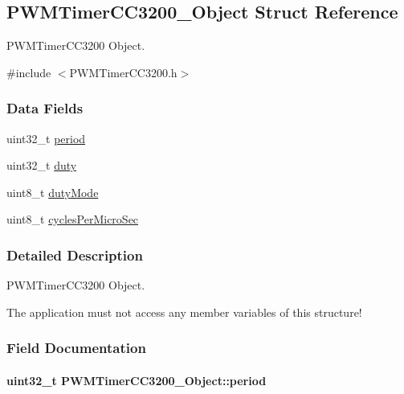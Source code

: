 \subsection{P\-W\-M\-Timer\-C\-C3200\-\_\-\-Object Struct Reference}
\label{struct_p_w_m_timer_c_c3200___object}


P\-W\-M\-Timer\-C\-C3200 Object.  




{\ttfamily \#include $<$P\-W\-M\-Timer\-C\-C3200.\-h$>$}

\subsubsection*{Data Fields}
\begin{DoxyCompactItemize}
\item 
uint32\-\_\-t \hyperlink{struct_p_w_m_timer_c_c3200___object_aef605d284151cde91a5ea31f247c0aed}{period}
\item 
uint32\-\_\-t \hyperlink{struct_p_w_m_timer_c_c3200___object_abcda935ccb7d1926e3044fe22c742ed7}{duty}
\item 
uint8\-\_\-t \hyperlink{struct_p_w_m_timer_c_c3200___object_af1f6cc3a1691db65a6dae41451f77789}{duty\-Mode}
\item 
uint8\-\_\-t \hyperlink{struct_p_w_m_timer_c_c3200___object_adf7dc7746a99106f353aeb980b401a7d}{cycles\-Per\-Micro\-Sec}
\end{DoxyCompactItemize}


\subsubsection{Detailed Description}
P\-W\-M\-Timer\-C\-C3200 Object. 

The application must not access any member variables of this structure! 

\subsubsection{Field Documentation}
\paragraph[{period}]{\setlength{\rightskip}{0pt plus 5cm}uint32\-\_\-t P\-W\-M\-Timer\-C\-C3200\-\_\-\-Object\-::period}\label{struct_p_w_m_timer_c_c3200___object_aef605d284151cde91a5ea31f247c0aed}
